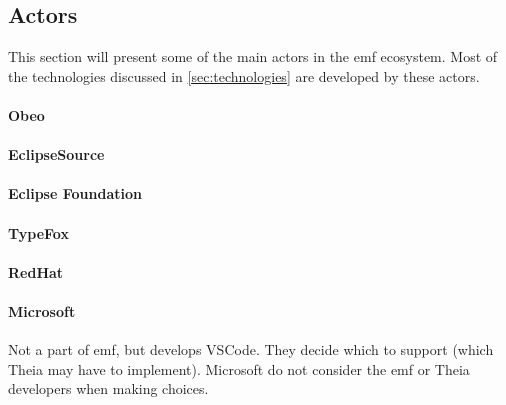 \subsection{Actors}

This section will present some of the main actors in the \acrlong{emf} ecosystem.
Most of the technologies discussed in \cref{sec:technologies} are developed by these actors.


\paragraph*{Obeo} %

\paragraph*{EclipseSource} %

\paragraph*{Eclipse Foundation} %

\paragraph*{TypeFox} %

\paragraph*{RedHat} %

\paragraph*{Microsoft} Not a part of \acrshort{emf}, but develops \gls{VSCode}. They decide which  to support (which \gls{Theia} may have to implement).
Microsoft do not consider the \acrshort{emf} or \gls{Theia} developers when  making choices. %
